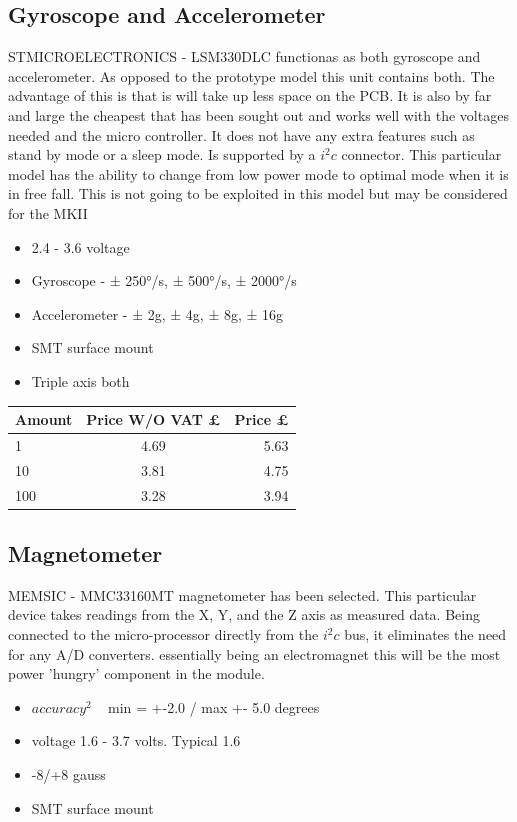 \documentclass{report}
\begin{document}
\subsection{Gyroscope and Accelerometer}
STMICROELECTRONICS - LSM330DLC functionas as both gyroscope and accelerometer. As opposed to the prototype model this unit contains both. The advantage of this is that is will take up less space on the PCB. It is also by far and large the cheapest that has been sought out and works well with the voltages needed and the micro controller. It does not have any extra features such as stand by mode or a sleep mode. Is supported by a $i^2c$ connector. This particular model has the ability to change from low power mode to optimal mode when it is in free fall. This is not going to be exploited in this model but may be considered for the MKII
\begin{itemize}
\item 2.4 - 3.6 voltage 
\item Gyroscope -  ± 250°/s, ± 500°/s, ± 2000°/s
\item Accelerometer - ± 2g, ± 4g, ± 8g, ± 16g
\item SMT surface mount 
\item Triple axis both
\end{itemize}

\begin{center}
  \begin{tabular}{ | l | c | r |}
    \hline
    Amount & Price W/O VAT £ & Price £ \\ \hline
    1 & 4.69 & 5.63 \\ \hline
    10 & 3.81 & 4.75 \\ \hline
    100 & 3.28& 3.94  \\ \hline
  \end{tabular}
\end{center}

\subsection{Magnetometer}
MEMSIC - MMC33160MT magnetometer has been selected. This particular device takes readings from the X, Y, and the Z axis as measured data. Being connected to the micro-processor directly from the $i^2c$ bus, it eliminates the need for any A/D converters.  essentially being an electromagnet this will be the most power 'hungry' component in the module.

\begin{itemize}
\item $accuracy^2$ ~ min = +-2.0 / max +- 5.0 degrees 
\item voltage 1.6 - 3.7 volts. Typical 1.6
\item -8/+8 gauss
\item SMT surface mount 
\end{itemize}
\end{document}
